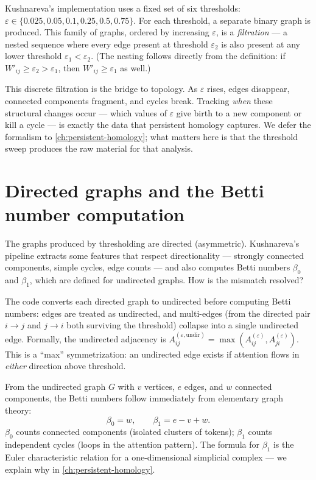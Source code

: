 Kushnareva's implementation uses a fixed set of six thresholds:
$\varepsilon \in \{0.025, 0.05, 0.1, 0.25, 0.5, 0.75\}$.  For each
threshold, a separate binary graph is produced.  This family of graphs,
ordered by increasing $\varepsilon$, is a \emph{filtration} --- a nested
sequence where every edge present at threshold $\varepsilon_2$ is also present
at any lower threshold $\varepsilon_1 < \varepsilon_2$.  (The nesting follows
directly from the definition: if $W'_{ij} \geq \varepsilon_2 > \varepsilon_1$,
then $W'_{ij} \geq \varepsilon_1$ as well.)

This discrete filtration is the bridge to topology.  As $\varepsilon$ rises,
edges disappear, connected components fragment, and cycles break.  Tracking
\emph{when} these structural changes occur --- which values of $\varepsilon$
give birth to a new component or kill a cycle --- is exactly the data that
persistent homology captures.  We defer the formalism to \autoref{ch:persistent-homology};
what matters here is that the threshold sweep produces the raw material for
that analysis.

\section{Directed graphs and the Betti number computation}
\label{sec:directed}

The graphs produced by thresholding are directed (asymmetric).  Kushnareva's
pipeline extracts some features that respect directionality --- strongly
connected components, simple cycles, edge counts --- and also computes Betti
numbers $\beta_0$ and $\beta_1$, which are defined for undirected graphs.  How
is the mismatch resolved?

The code converts each directed graph to undirected before computing Betti
numbers: edges are treated as undirected, and multi-edges (from the directed
pair $i \to j$ and $j \to i$ both surviving the threshold) collapse into a
single undirected edge.  Formally, the undirected adjacency is
$A^{(\varepsilon, \text{undir})}_{ij} = \max(A^{(\varepsilon)}_{ij},
A^{(\varepsilon)}_{ji})$.  This is a ``max'' symmetrization: an undirected edge
exists if attention flows in \emph{either} direction above threshold.

From the undirected graph $G$ with $v$ vertices, $e$ edges, and $w$ connected
components, the Betti numbers follow immediately from elementary graph theory:
\[
  \beta_0 = w, \qquad \beta_1 = e - v + w.
\]
$\beta_0$ counts connected components (isolated clusters of tokens);
$\beta_1$ counts independent cycles (loops in the attention pattern).
The formula for $\beta_1$ is the Euler characteristic relation for a
one-dimensional simplicial complex --- we explain why in
\autoref{ch:persistent-homology}.

